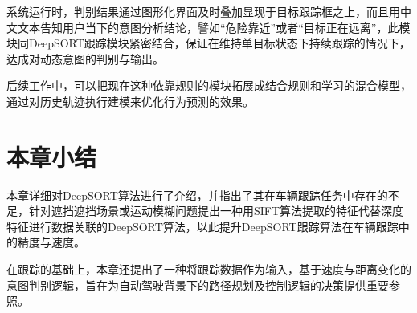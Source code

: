 系统运行时，判别结果通过图形化界面及时叠加显现于目标跟踪框之上，而且用中文文本告知用户当下的意图分析结论，譬如“危险靠近”或者“目标正在远离”，此模块同DeepSORT跟踪模块紧密结合，保证在维持单目标状态下持续跟踪的情况下，达成对动态意图的判别与输出。

后续工作中，可以把现在这种依靠规则的模块拓展成结合规则和学习的混合模型，通过对历史轨迹执行建模来优化行为预测的效果。


\section{本章小结}

本章详细对DeepSORT算法进行了介绍，并指出了其在车辆跟踪任务中存在的不足，针对遮挡遮挡场景或运动模糊问题提出一种用SIFT算法提取的特征代替深度特征进行数据关联的DeepSORT算法，以此提升DeepSORT跟踪算法在车辆跟踪中的精度与速度。

在跟踪的基础上，本章还提出了一种将跟踪数据作为输入，基于速度与距离变化的意图判别逻辑，旨在为自动驾驶背景下的路径规划及控制逻辑的决策提供重要参照。

\begin{tabular}{l l}
\end{tabular}

